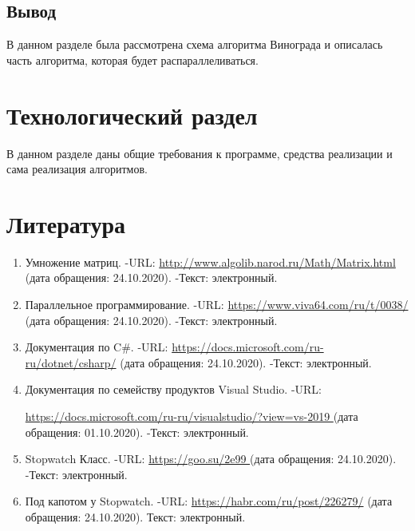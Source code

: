 \documentclass[14pt, a4paper]{extarticle}
\begin{document}
\subsection{Вывод}
В данном разделе была рассмотрена схема алгоритма Винограда и описалась часть алгоритма, которая будет распараллеливаться.

\clearpage
\section{Технологический раздел}
В данном разделе даны общие требования к программе, средства реализации и сама реализация алгоритмов.



\clearpage
\section*{Литература}
\begin{enumerate}
	\label{literature}
	\item Умножение матриц. -URL: \href{http://www.algolib.narod.ru/Math/Matrix.html}{http://www.algolib.narod.ru/Math/Matrix.html} (дата обращения: 24.10.2020). -Текст: электронный.
	\item Параллельное программирование. -URL: \href{https://www.viva64.com/ru/t/0038/}{https://www.viva64.com/ru/t/0038/} (дата обращения: 24.10.2020). -Текст: электронный.
	\item  Документация по C\#. -URL: \href{https://docs.microsoft.com/ru-ru/dotnet/csharp/}{https://docs.microsoft.com/ru-ru/dotnet/csharp/} (дата обращения: 24.10.2020). -Текст: электронный.
	\item Документация по семейству продуктов Visual Studio. -URL:\par \href{https://docs.microsoft.com/ru-ru/visualstudio/?view=vs-2019}{https://docs.microsoft.com/ru-ru/visualstudio/?view=vs-2019 } (дата обращения: 01.10.2020). -Текст: электронный.
	\item Stopwatch Класс. -URL: \href{https://goo.su/2e99}{https://goo.su/2e99 } (дата обращения: 24.10.2020). -Текст: электронный.
	\item Под капотом у Stopwatch. -URL:  \href{https://habr.com/ru/post/226279/}{https://habr.com/ru/post/226279/} (дата обращения: 24.10.2020). Текст: электронный.
\end{enumerate}
\end{document}
